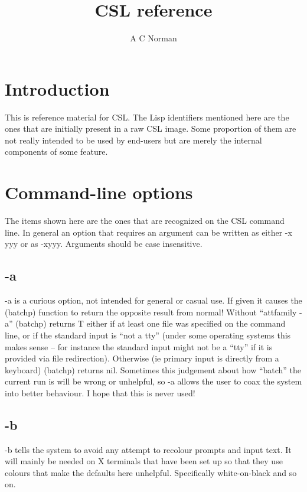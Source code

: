 \documentclass[a4paper,11pt]{article}
\title{CSL reference}
\author{A C Norman}
\begin{document}
\maketitle


\section{Introduction}
This is reference material for CSL. The Lisp identifiers mentioned here are
the ones that are initially present in a raw CSL image. Some proportion of them
are not really intended to be used by end-users but are merely the
internal components of some feature.

\section{Command-line options}

The items shown here are the ones that are recognized on the CSL command
line. In general an option that requires an argument can be written as either
{\ttfamily -x yyy} or as {\ttfamily -xyyy}. Arguments should be case
insensitive. 

\subsection{\ttfamily -a}
{\ttfamily -a} is a curious option, not intended for general or casual use.
If given it causes the {\ttfamily (batchp)} function to return the opposite
result from normal!  Without ``{attfamily -a}'' {\ttfamily (batchp)} returns
{\ttfamily T} either if at least one file was specified on the command line,
or if the standard input is ``not a tty'' (under some operating systems this
makes sense -- for instance the standard input might not be a ``tty'' if it
is provided via file redirection).  Otherwise (ie primary input is directly
from a keyboard) {\ttfamily (batchp)} returns {\ttfamily nil}.  Sometimes
this judgement about how ``batch'' the current run is will be wrong or
unhelpful, so {\ttfamily -a} allows the user to coax the system into better
behaviour.  I hope that this is never used!

\subsection{\ttfamily -b}
{\ttfamily -b} tells the system to avoid any attempt to recolour prompts and
input text. It will mainly be needed on X terminals that have been set up
so that they use colours that make the defaults here unhelpful.
Specifically white-on-black and so on.
\end{document}
